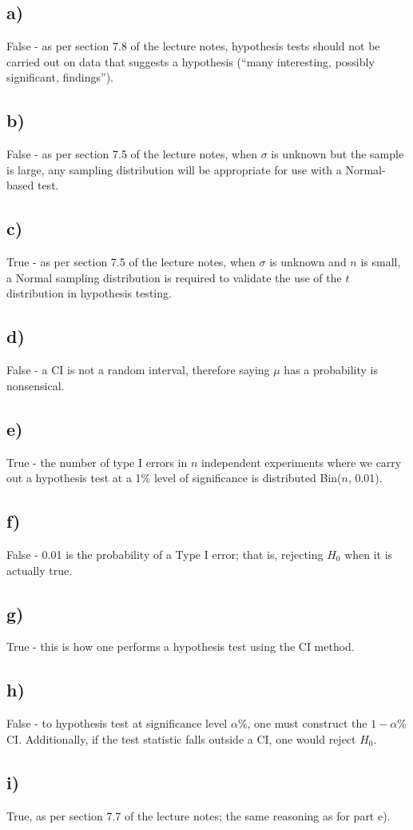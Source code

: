 \documentclass[]{article}
\begin{document}
\subsection{a)}
False - as per section 7.8 of the lecture notes, hypothesis tests should not be carried out on data that suggests a hypothesis (``many interesting, possibly significant, findings'').

\subsection{b)}
False - as per section 7.5 of the lecture notes, when $\sigma$ is unknown but the sample is large, any sampling distribution will be appropriate for use with a Normal-based test.

\subsection{c)}
True - as per section 7.5 of the lecture notes, when $\sigma$ is unknown and $n$ is small, a Normal sampling distribution is required to validate the use of the $t$ distribution in hypothesis testing.

\subsection{d)}
False - a CI is not a random interval, therefore saying $\mu$ has a probability is nonsensical.

\subsection{e)}
True - the number of type I errors in $n$ independent experiments where we carry out a
hypothesis test at a 1\% level of significance is distributed Bin($n$, 0.01).

\subsection{f)}
False - 0.01 is the probability of a Type I error; that is, rejecting $H_0$ when it is actually true.

\subsection{g)}
True - this is how one performs a hypothesis test using the CI method.

\subsection{h)}
False - to hypothesis test at significance level $\alpha$\%, one must construct the $1-\alpha$\% CI. Additionally, if the test statistic falls outside a CI, one would reject $H_0$.

\subsection{i)}
True, as per section 7.7 of the lecture notes; the same reasoning as for part e).
\end{document}
